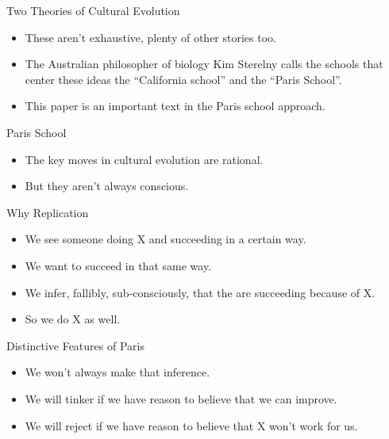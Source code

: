 \documentclass[
  17pt,
  letterpaper,
  ignorenonframetext,
  aspectratio=169,
  handout]{beamer}
\providecommand{\tightlist}{%
  \setlength{\itemsep}{0pt}\setlength{\parskip}{0pt}}\usepackage{longtable,booktabs,array}
\begin{document}
\begin{frame}{Two Theories of Cultural Evolution}
\protect\hypertarget{two-theories-of-cultural-evolution-1}{}
\begin{itemize}[<+->]
\tightlist
\item
  These aren't exhaustive, plenty of other stories too.
\item
  The Australian philosopher of biology Kim Sterelny calls the schools
  that center these ideas the ``California school'' and the ``Paris
  School''.
\item
  This paper is an important text in the Paris school approach.
\end{itemize}
\end{frame}

\begin{frame}{Paris School}
\protect\hypertarget{paris-school}{}
\begin{itemize}[<+->]
\tightlist
\item
  The key moves in cultural evolution are rational.
\item
  But they aren't always conscious.
\end{itemize}
\end{frame}

\begin{frame}{Why Replication}
\protect\hypertarget{why-replication}{}
\begin{itemize}[<+->]
\tightlist
\item
  We see someone doing X and succeeding in a certain way.
\item
  We want to succeed in that same way.
\item
  We infer, fallibly, sub-consciously, that the are succeeding because
  of X.
\item
  So we do X as well.
\end{itemize}
\end{frame}

\begin{frame}{Distinctive Features of Paris}
\protect\hypertarget{distinctive-features-of-paris}{}
\begin{itemize}[<+->]
\tightlist
\item
  We won't always make that inference.
\item
  We will tinker if we have reason to believe that we can improve.
\item
  We will reject if we have reason to believe that X won't work for us.
\end{itemize}
\end{frame}
\end{document}
